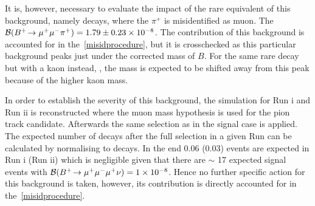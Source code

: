 It is, however, necessary to evaluate the impact of the rare equivalent of this background, namely \bmumupi decays, where the $\pi^{+}$ is misidentified as muon. The $\mathcal{B}({{{B}^+}}\!\rightarrow {\ensuremath{\mu^+\mu^-}}{\ensuremath{{\pi}^+}})=1.79\pm0.23\times 10^{-8}$\cite{Patrignani:2016xqp}. The contribution of this background is accounted for in the~\autoref{misidprocedure}, but it is crosschecked as this particular background peaks just under the corrected mass of $B$. For the same rare decay but with a kaon instead, \bmumuk, the mass is expected to be shifted away from this peak because of the higher kaon mass.

In order to establish the severity of this background, the \bmumupi simulation for Run \Rn{1} and Run \Rn{2} is reconstructed where the muon mass hypothesis is used for the pion track candidate. %
Afterwards the same selection as in the signal case is applied. The expected number of \bmumupi decays after the full selection in a given Run can be calculated by normalising to \bjpsimumuk decays. In the end 0.06 (0.03) \bmumupi events are expected in Run \Rn{1} (Run \Rn{2}) which is negligible given that there are $\sim$ 17 expected signal events with $\mathcal{B}({{{B}^+}}\!\rightarrow {\ensuremath{\mu^+\mu^-\mu^+}}\nu)=1\times 10^{-8}$. Hence no further specific action for this background is taken, however, its contribution is directly accounted for in the~\autoref{misidprocedure}.






